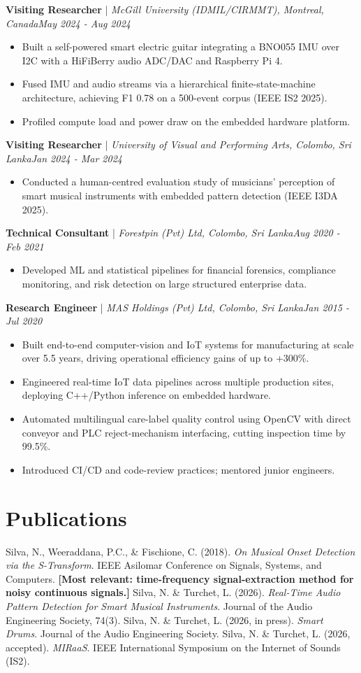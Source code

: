 \documentclass[11pt]{article}
\newenvironment{cvrole}[5]{%
  \par\noindent\textbf{\large #1} | \textit{\small #2, #3}\hfill \textit{\small #4 - #5}\par
  \begin{itemize}[leftmargin=2em, itemsep=-0.3em, topsep=-0.5em]%
}{%
  \end{itemize}\par\noindent\mbox{}\par\vspace{0.1em}%
}
\begin{document}
\begin{cvrole}{Visiting Researcher}{McGill University (IDMIL/CIRMMT)}{Montreal, Canada}{May 2024}{Aug 2024}
\item Built a self-powered smart electric guitar integrating a BNO055 IMU over I2C with a HiFiBerry audio ADC/DAC and Raspberry Pi 4.
\item Fused IMU and audio streams via a hierarchical finite-state-machine architecture, achieving F1 0.78 on a 500-event corpus (IEEE IS2 2025).
\item Profiled compute load and power draw on the embedded hardware platform.
\end{cvrole}

\begin{cvrole}{Visiting Researcher}{University of Visual and Performing Arts}{Colombo, Sri Lanka}{Jan 2024}{Mar 2024}
\item Conducted a human-centred evaluation study of musicians' perception of smart musical instruments with embedded pattern detection (IEEE I3DA 2025).
\end{cvrole}

\begin{cvrole}{Technical Consultant}{Forestpin (Pvt) Ltd}{Colombo, Sri Lanka}{Aug 2020}{Feb 2021}
\item Developed ML and statistical pipelines for financial forensics, compliance monitoring, and risk detection on large structured enterprise data.
\end{cvrole}

\begin{cvrole}{Research Engineer}{MAS Holdings (Pvt) Ltd}{Colombo, Sri Lanka}{Jan 2015}{Jul 2020}
\item Built end-to-end computer-vision and IoT systems for manufacturing at scale over 5.5 years, driving operational efficiency gains of up to +300\%.
\item Engineered real-time IoT data pipelines across multiple production sites, deploying C++/Python inference on embedded hardware.
\item Automated multilingual care-label quality control using OpenCV with direct conveyor and PLC reject-mechanism interfacing, cutting inspection time by 99.5\%.
\item Introduced CI/CD and code-review practices; mentored junior engineers.
\end{cvrole}

\section*{Publications}
Silva, N., Weeraddana, P.C., \& Fischione, C. (2018). \textit{On Musical Onset Detection via the S-Transform}. IEEE Asilomar Conference on Signals, Systems, and Computers. \textbf{[Most relevant: time-frequency signal-extraction method for noisy continuous signals.]} Silva, N. \& Turchet, L. (2026). \textit{Real-Time Audio Pattern Detection for Smart Musical Instruments}. Journal of the Audio Engineering Society, 74(3). Silva, N. \& Turchet, L. (2026, in press). \textit{Smart Drums}. Journal of the Audio Engineering Society. Silva, N. \& Turchet, L. (2026, accepted). \textit{MIRaaS}. IEEE International Symposium on the Internet of Sounds (IS2).
\end{document}
